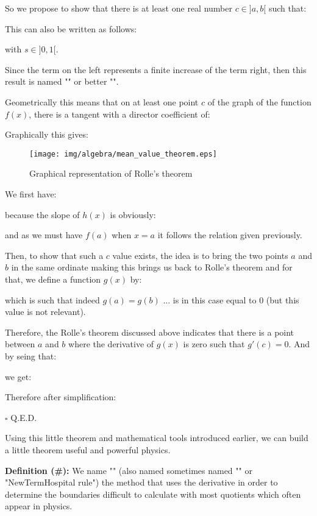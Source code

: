 \begin{theorem}
	So we propose to show that there is at least one real number $c \in ]a,b[ $ such that:
	
This can also be written as follows:
	
with $s\in ]0,1[.$

Since the term on the left represents a finite increase of the term right, then this result is named "" or better "".

Geometrically this means that on at least one point $c$ of the graph of the function $f (x)$, there is a tangent with a director coefficient of:
	
Graphically this gives:
\begin{figure}[H]
\centering
\texttt{[image: img/algebra/mean\_value\_theorem.eps]}
\caption{Graphical representation of Rolle's theorem}
\end{figure}

\end{theorem}
\begin{dem}
	We first have:
	
	because the slope of $h(x)$ is obviously:
		
 and as we must have $f(a)$ when $x=a$ it follows the relation given previously.

Then, to show that such a $c$ value exists, the idea is to bring the two points $a$ and $b$ in the same ordinate making this brings us back to Rolle's theorem and for that, we define a function $g(x)$ by:
	
which is such that indeed $g(a)=g(b)$ ... is in this case equal to $0$ (but this value is not relevant).

Therefore, the Rolle's theorem discussed above indicates that there is a point between $a$ and $b$ where the derivative of $g(x)$ is zero such that $g'(c)=0$. And by seing that:
	
we get:
	
	Therefore after simplification:
		
		\begin{flushright}
			$\square$  Q.E.D.
		\end{flushright}
\end{dem}
Using this little theorem and mathematical tools introduced earlier, we can build a little theorem useful and powerful physics.

\textbf{Definition (\#\mydef):} We name  "" (also named sometimes named "" or "NewTerm{Hospital rule}") the method that uses the derivative in order to determine the boundaries difficult to calculate with most quotients which often appear in physics.

